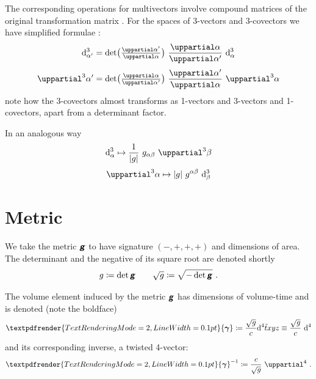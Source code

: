 \documentclass[\ifafour a4paper,12pt,\else a5paper,10pt,\fi%
onecolumn,oneside,article,%
british%
]{memoir}
\theoremstyle{remark}
\theoremstyle{innote}
\newcommand*{\mathte}[1]{\textbf{\textit{\textsf{#1}}}}
\renewcommand*{\bm}[1]{\textpdfrender{TextRenderingMode=2,LineWidth=0.1pt}{\boldsymbol{#1}}}
\newcommand*{\de}{\uppartial}%
\newcommand*{\di}{\mathrm{d}}%
\newcommand*{\defd}{\coloneqq}
\DeclarePairedDelimiter\abs{\lvert}{\rvert}
\renewcommand*{\|}[1][]{\nonscript\:#1\vert\nonscript\:\mathopen{}}
\newcommand*{\sect}{\S}%
\newcommand*{\eqn}{eq.}%
\newcommand*{\ssssi}[1]{\di^{4}{#1}}
\newcommand*{\tw}[1]{\tilde{#1}}
\newcommand*{\ttte}[1]{\de^{3}{#1}}
\newcommand*{\tttte}[1]{\de^{4}{#1}}
\newcommand*{\ttti}[1]{\di^{3}_{#1}}
\newcommand*{\tttti}[1]{\di^{4}_{#1}}
\newcommand*{\yg}{\mathte{g}}
\newcommand*{\dg}{\sqrt{g}}
\newcommand*{\ve}{\bm{\gamma}}
\newcommand*{\vi}{\bm{\gamma}^{-1}}
\begin{document}
The corresponding operations for multivectors involve {compound matrices} of the original transformation matrix \autocites[\sect~IV.A.1 p.~199]{choquetbruhatetal1977_r1996}. For the spaces of 3-vectors and 3-covectors we have simplified formulae \autocites[\sect~I.4 \eqn~(33)]{gantmacher1959_r2000}:
\begin{equation}
  \label{eq:transf3_simple}
  \begin{gathered}
    \ttti{\alpha'} =
    \det\bigl(
    \tfrac{\de \alpha'}{\de \alpha}
    \bigr)
    \ 
    \frac{\de \alpha}{\de \alpha'}
    \ 
    \ttti{\alpha}
    \\[\jot]
    \ttte{\alpha'} =
    \det\bigl(
    \tfrac{\de \alpha}{\de \alpha'}
    \bigr)
    \ 
    \frac{\de \alpha'}{\de \alpha}
    \ 
    \ttte{\alpha}
  \end{gathered}
\end{equation}
note how the 3-covectors almost transforms as 1-vectors and 3-vectors and 1-covectors, apart from a determinant factor.

In an analogous way
\begin{equation}
  \label{eq:raise3_simple}
  \begin{gathered}
    \ttti{\alpha}
    \mapsto
\frac{1}{\abs{g}}\ g_{\alpha\beta}\
    \ttte{\beta}
    \\[\jot]
    \ttte{\alpha}
    \mapsto
\abs{g}\ g^{\alpha\beta}\
    \ttti{\beta}
  \end{gathered}
\end{equation}


\section{Metric}
\label{sec:metric}

We take the metric $\yg$ to have signature $(-,+,+,+)$ and dimensions of area. The determinant and the negative of its square root are denoted shortly
\begin{equation}
  \label{eq:det_g}
  g\defd \det\yg
  \qquad
\dg \defd \sqrt{-\det\yg} \ .
\end{equation}

The volume element induced by the metric $\yg$ has dimensions of volume-time and is denoted (note the boldface)
\begin{equation}
  \label{eq:vol_element}
  \ve \defd \frac{\dg}{c} \ssssi{\tw{t}xyz} \equiv \frac{\dg}{c}\ \tttti{}
\end{equation}
and its corresponding inverse, a twisted 4-vector:
\begin{equation}
  \label{eq:inv_vol_element}
  \vi \defd \frac{c}{\dg}\ \tttte{} \ .
\end{equation}
\end{document}
